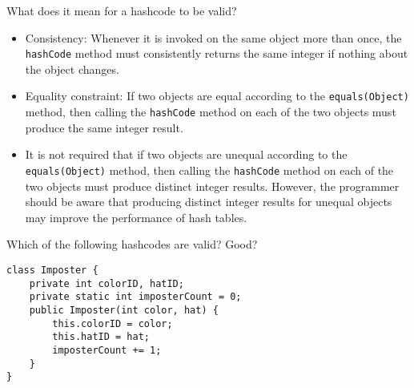 \begin{blocksection}
\question What does it mean for a hashcode to be valid?
\begin{solution}[0.75in]
\begin{itemize}
\item Consistency: Whenever it is invoked on the same object more than once,
the \lstinline$hashCode$ method must consistently returns the same integer if
nothing about the object changes.
\item Equality constraint: If two objects are equal according to the
\lstinline$equals(Object)$ method, then calling the \lstinline$hashCode$ method
on each of the two objects must produce the same integer result.
\item It is not required that if two objects are unequal according to the
\lstinline$equals(Object)$ method, then calling the \lstinline$hashCode$ method
on each of the two objects must produce distinct integer results. However, the
programmer should be aware that producing distinct integer results for unequal
objects may improve the performance of hash tables.
\end{itemize}
\end{solution}
\end{blocksection}

\question Which of the following hashcodes are valid? Good?

\begin{lstlisting}
class Imposter {
    private int colorID, hatID;
    private static int imposterCount = 0;
    public Imposter(int color, hat) {
        this.colorID = color;
        this.hatID = hat;
        imposterCount += 1;
    }
}
\end{lstlisting}

